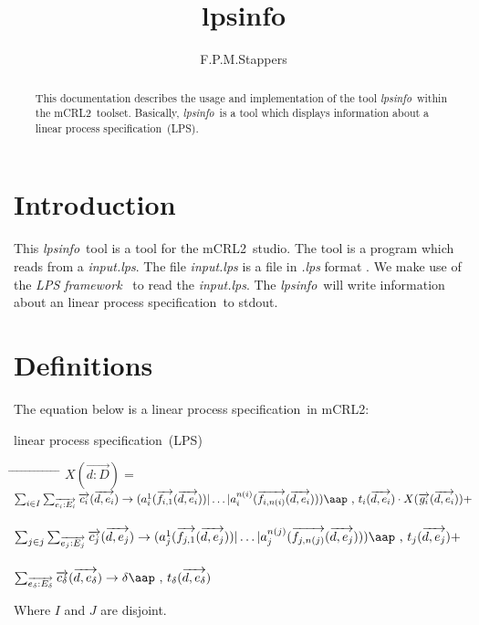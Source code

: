 \documentclass[a4paper,10pt]{article}
\title{lpsinfo}
\author{F.P.M.Stappers}
\theoremstyle{plain}
\theoremstyle{definition}
\newcommand{\mcrl}{mCRL2}
\newcommand{\lps}{linear process specification}
\newcommand{\tool}{\textit{lpsinfo}}
\newcommand{\ti}{\textit}
\newcommand{\ovr}{\overrightarrow}
\newcommand{\framework}{\textit{LPS framework} \cite{LPSframework}}
\newcommand{\tab}{\hspace*{5.mm} \= \hspace*{5.mm} \= \hspace*{5.mm} \= \hspace*{5.mm} \= \hspace*{5.mm} \= \hspace*{5.mm}  \= \hspace*{5.mm}  \= \hspace*{5.mm}  \= \hspace*{5.mm} \= \hspace*{5.mm} \= \hspace*{5.mm}  \= \hspace*{5.mm}  \= \hspace*{5.mm}\kill}
\newcommand{\at}[1]{\mbox{\aap ,} #1}
\begin{document}
\maketitle

\begin{abstract}
This documentation describes the usage and implementation of the tool \tool\ within the \mcrl\ toolset.
Basically, \tool\ is a tool which displays information about a \lps\ (LPS).
\end{abstract}

\section{Introduction}
This \tool\ tool is a tool for the \mcrl\ studio. The tool is a program which reads from a \ti{input.lps}. The file \ti{input.lps} is
a file in \ti{.lps} format \cite{LPSformat}. We make use of the
\framework\ to read the \ti{input.lps}. The \tool\ will write
information about an \lps\ to stdout.
\section{Definitions} \label{sec:def}

The equation below is a \lps\ in \mcrl :
\begin{defn}\lps\ (LPS) \newline
\begin{tabbing}
\tab
$X (\ovr{d: D}) = $ \> \> \> $ \sum_{i \in I} \sum_{\ovr{e_i: E_i}} \ovr{c_i} ( \ovr{d, e_i }) \rightarrow
(a_i^1 (\ovr{f_{i,1}}(\ovr{d,e_i})) \vert \ldots \vert a_i^{n(i)}(\ovr{f_{i,n(i)}}(\ovr{d,e_i}))) \at \text{ } t_i(\ovr{d,e_i})  \cdot X(\ovr{g_i}(\ovr{d,e_i})) +$ \\ \\
\> \> \> $ \sum_{j \in j} \sum_{\ovr{e_j: E_j}} \ovr{c_j} ( \ovr{d, e_j} ) \rightarrow
(a_j^1 (\ovr{f_{j,1}}(\ovr{d,e_j})) \vert \ldots \vert a_j^{n(j)}(\ovr{f_{j,n(j)}}(\ovr{d,e_j}))) \at \text{ } t_j(\ovr{d,e_j}) + $ \\ \\
\> \> \> $\sum_{\ovr{e_\delta:E_\delta}} \ovr{c_\delta} ( \ovr{d, e_\delta}) \rightarrow
\delta \at \text{ } t_\delta(\ovr{d,e_\delta})$
\end{tabbing}

Where $I$ and $J$ are disjoint.\\
\end{defn}
\end{document}
